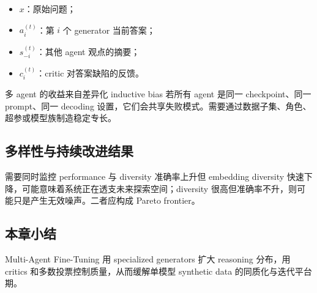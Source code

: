 \documentclass[a4paper]{article}
\begin{document}
\begin{itemize}
    \item $x$：原始问题；
    \item $a_i^{(t)}$：第 $i$ 个 generator 当前答案；
    \item $s_{-i}^{(t)}$：其他 agent 观点的摘要；
    \item $c_i^{(t)}$：critic 对答案缺陷的反馈。
\end{itemize}


\begin{importantbox}{多 agent 的收益来自差异化 inductive bias}
若所有 agent 是同一 checkpoint、同一 prompt、同一 decoding 设置，它们会共享失败模式。需要通过数据子集、角色、超参或模型族制造稳定专长。
\end{importantbox}

\subsection{多样性与持续改进结果}




\begin{knowledgebox}{需要同时监控 performance 与 diversity}
准确率上升但 embedding diversity 快速下降，可能意味着系统正在透支未来探索空间；diversity 很高但准确率不升，则可能只是产生无效噪声。二者应构成 Pareto frontier。
\end{knowledgebox}

\subsection{本章小结}

Multi-Agent Fine-Tuning 用 specialized generators 扩大 reasoning 分布，用 critics 和多数投票控制质量，从而缓解单模型 synthetic data 的同质化与迭代平台期。
\end{document}
